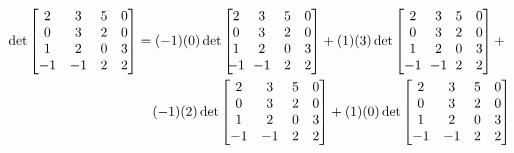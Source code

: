 \begin{applicationActivities}{2}{26}
\begin{activity}{15}
\end{activity}

\begin{observation}
\newcommand{\tikzmark}[2]{\tikz[overlay,remember picture,baseline] \node [anchor=base] (#1) {$#2$};}

\newcommand{\DrawVLine}[3][]{%
  \begin{tikzpicture}[overlay,remember picture]
    \draw[#1] (#2.north) -- (#3.south);
  \end{tikzpicture}
}
\newcommand{\DrawHLine}[3][]{%
  \begin{tikzpicture}[overlay,remember picture]
    \draw[#1] (#2.west) -- (#3.east);
  \end{tikzpicture}
}

  \begin{align*}
\det \begin{bmatrix} 2 & 3 & 5 & 0 \\ 0 & 3 & 2 & 0 \\ 1 & 2 & 0 & 3 \\ -1 & -1 & 2 & 2 \end{bmatrix} &= 
(-1) (0) \det \begin{bmatrix} \tikzmark{topA}{2} & 3 & 5 & 0 \\ \tikzmark{leftA}{0} & 3 & 2 & \tikzmark{rightA}{0} \\ 1 & 2 & 0 & 3 \\ \tikzmark{bottomA}{-1} & -1 & 2 & 2 \end{bmatrix}
+(1)(3) \det \begin{bmatrix} 2 & \tikzmark{topB}{3} & 5 & 0 \\ \tikzmark{leftB}{0} & 3 & 2 & \tikzmark{rightB}{0} \\ 1 & 2 & 0 & 3 \\ -1 & \tikzmark{bottomB}{-1} & 2 & 2 \end{bmatrix} +  \\
&\phantom{xx} (-1)(2) \det \begin{bmatrix} 2 & 3 & \tikzmark{topC}{5} & 0 \\ \tikzmark{leftC}{0} & 3 & 2 & \tikzmark{rightC}{0} \\ 1 & 2 & 0 & 3 \\ -1 & -1 & \tikzmark{bottomC}{2} & 2 \end{bmatrix} 
+ (1)(0) \det \begin{bmatrix} 2 & 3 & 5 & \tikzmark{topD}{0} \\ \tikzmark{leftD}{0} & 3 & 2 & \tikzmark{rightD}{0} \\ 1 & 2 & 0 & 3 \\ -1 & -1 & 2 & \tikzmark{bottomD}{2} \end{bmatrix}  \\

\end{align*}
\end{observation}
\end{applicationActivities}
